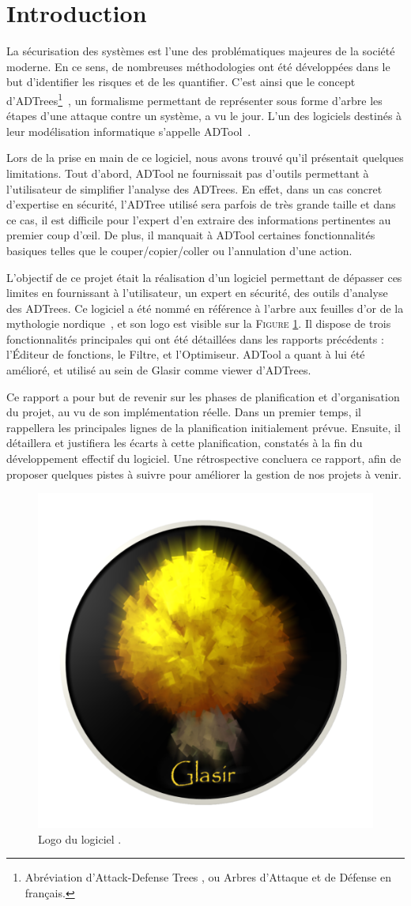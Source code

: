 \section{Introduction}
\label{sec:intro}

	La sécurisation des systèmes est l'une des problématiques majeures de la société moderne. En ce sens, de nombreuses méthodologies ont été développées dans le but d'identifier les risques et de les quantifier. C'est ainsi que le concept d'ADTrees\footnote{Abréviation d'\og Attack-Defense Trees \fg{}, ou \og Arbres d'Attaque et de Défense \fg{} en français.}~\cite{ADTrees}, un formalisme permettant de représenter sous forme d'arbre les étapes d'une attaque contre un système, a vu le jour. L'un des logiciels destinés à leur modélisation informatique s'appelle ADTool~\cite{ADToolPP}.

    Lors de la prise en main de ce logiciel, nous avons trouvé qu'il présentait quelques limitations. Tout d'abord, ADTool ne fournissait pas d'outils permettant à l'utilisateur de simplifier l'analyse des ADTrees. En effet, dans un cas concret d'expertise en sécurité, l'ADTree utilisé sera parfois de très grande taille et dans ce cas, il est difficile pour l'expert d'en extraire des informations pertinentes au premier coup d’œil. De plus, il manquait à ADTool certaines fonctionnalités \og basiques \fg{} telles que le couper/copier/coller ou l'annulation d'une action. 

    L'objectif de ce projet était la réalisation d'un logiciel permettant de dépasser ces limites en fournissant à l'utilisateur, un expert en sécurité, des outils d'analyse des ADTrees. Ce logiciel a été nommé \glasir{} en référence à l'arbre aux feuilles d'or de la mythologie nordique~\cite{vikingCulture}, et son logo est visible sur la \textsc{Figure} \ref{fig:glasir}. Il dispose de trois fonctionnalités principales qui ont été détaillées dans les rapports précédents : l'Éditeur de fonctions, le Filtre, et l'Optimiseur. ADTool a quant à lui été amélioré, et utilisé au sein de Glasir comme viewer d'ADTrees.

    Ce rapport a pour but de revenir sur les phases de planification et d'organisation du projet, au vu de son implémentation réelle. Dans un premier temps, il rappellera les principales lignes de la planification initialement prévue. Ensuite, il détaillera et justifiera les écarts à cette planification, constatés à la fin du développement effectif du logiciel. Une rétrospective concluera ce rapport, afin de proposer quelques pistes à suivre pour améliorer la gestion de nos projets à venir.

    \begin{figure}[H]
        \centering
        \includegraphics[height=0.4\textwidth]{figure/glasir.png}
        \caption{Logo du logiciel \glasir{}.}
        \label{fig:glasir}
    \end{figure}